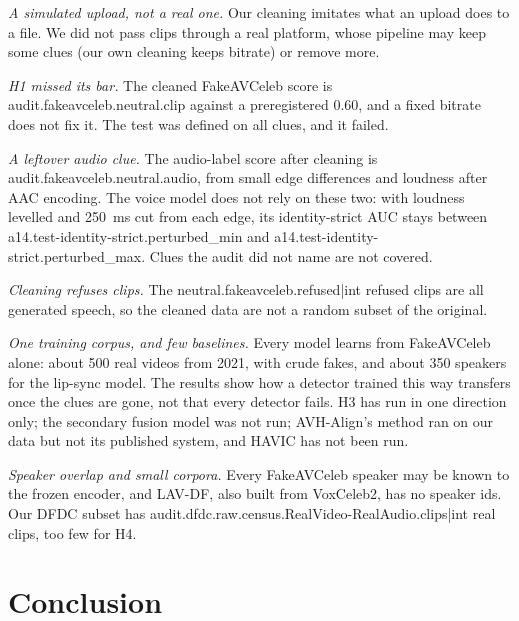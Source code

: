 \documentclass[conference]{IEEEtran}
\begin{document}
\textit{A simulated upload, not a real one.} Our cleaning imitates what an
upload does to a file. We did not pass clips through a real platform, whose
pipeline may keep some clues (our own cleaning keeps bitrate) or remove more.

\textit{H1 missed its bar.} The cleaned FakeAVCeleb score is
{{audit.fakeavceleb.neutral.clip}} against a preregistered 0.60, and a fixed
bitrate does not fix it. The test was defined on all clues, and it failed.

\textit{A leftover audio clue.} The audio-label score after cleaning is
{{audit.fakeavceleb.neutral.audio}}, from small edge differences and loudness
after AAC encoding. The voice model does not rely on these two: with loudness
levelled and 250~ms cut from each edge, its identity-strict AUC stays between
{{a14.test-identity-strict.perturbed_min}} and
{{a14.test-identity-strict.perturbed_max}}. Clues the audit did not name are not
covered.

\textit{Cleaning refuses clips.} The {{neutral.fakeavceleb.refused|int}}
refused clips are all generated speech, so the cleaned data are not a random
subset of the original.

\textit{One training corpus, and few baselines.} Every model learns from
FakeAVCeleb alone: about 500 real videos from 2021, with crude fakes, and about
350 speakers for the lip-sync model. The results show how a detector trained
this way transfers once the clues are gone, not that every detector fails. H3
has run in one direction only; the secondary fusion model was not run;
AVH-Align's method ran on our data but not its published system, and HAVIC has
not been run.

\textit{Speaker overlap and small corpora.} Every FakeAVCeleb speaker may be
known to the frozen encoder, and LAV-DF, also built from VoxCeleb2, has no
speaker ids. Our DFDC subset has
{{audit.dfdc.raw.census.RealVideo-RealAudio.clips|int}} real clips, too few for
H4.

\section{Conclusion}
\label{sec:conclusion}
\end{document}
